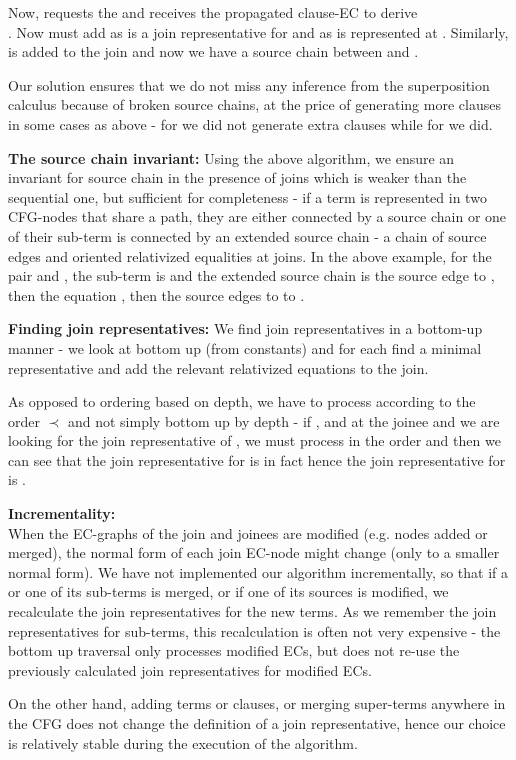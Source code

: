 Now,  requests the \GFA{}  and receives the propagated clause-EC   to derive\\
. Now  must add  as  is a join representative for  and as  is represented at . Similarly,  is added to the join and now we have a source chain between  and .

Our solution ensures that we do not miss any inference from the superposition calculus because of broken source chains, at the price of generating more clauses in some cases as above - for  we did not generate extra clauses while for  we did.

\textbf{The source chain invariant:}
Using the above algorithm, we ensure an invariant for source chain in the presence of joins which is weaker than the sequential one, but sufficient for completeness - if a term is represented in two CFG-nodes that share a path, they are either connected by a source chain or one of their sub-term is connected by an extended source chain - a chain of source edges and oriented relativized equalities at joins.
In the above example, for the pair  and , the sub-term is  and the extended source chain is the source edge  to , then the equation , then the source edges  to  to .

\textbf{Finding join representatives:}
We find join representatives in a bottom-up manner - we look at  bottom up (from constants) and for each \GT{} find a minimal representative and add the relevant relativized equations to the join. 

As opposed to ordering based on depth, we have to process \GTs{} according to the order $\prec$ and not simply bottom up by depth - 
if , and at the joinee  and we are looking for the join representative of , we must process \GTs{} in the order \m{[a], [f(a)], [f(f(a))], [c]} and then we can see that the join representative for \m{[c]} is in fact \m{[f(f(a))]} hence the join representative for  is \m{[g(f(f(a)))]}.

\textbf{Incrementality:}\\
When the EC-graphs of the join and joinees are modified (e.g. nodes added or merged), the normal form of each join EC-node might change (only to a smaller normal form). We have not implemented our algorithm incrementally, so that if a \GT{} or one of its sub-terms is merged, or if one of its sources is modified, we recalculate the join representatives for the new terms. As we remember the join representatives for sub-terms, this recalculation is often not very expensive - the bottom up traversal only processes modified ECs, but does not re-use the previously calculated join representatives for modified ECs.

On the other hand, adding terms or clauses, or merging super-terms anywhere in the CFG does not change the definition of a join representative, hence our choice is relatively stable during the execution of the algorithm.


\newpage
